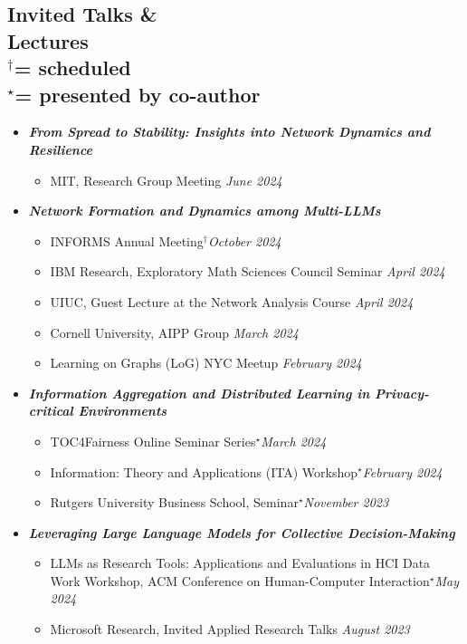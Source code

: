 \documentclass[margin]{res}
\newcommand{\scheduled}[0]{\ensuremath {^\dagger}}
\newcommand{\presentedbycoauthor}[0]{\ensuremath {^{\star}}}
\newcommand{\bemph}[1]{\textbf{\emph{#1}}}
\begin{document}
\begin{resume}
\section{Invited Talks \& \\ Lectures \\
\footnotesize
\scheduled  = \textup{scheduled} \\ \presentedbycoauthor = \textup{presented by co-author}
}

\begin{itemize}[nosep]
	\item \bemph{From Spread to Stability: Insights into Network Dynamics and Resilience}
	\begin{itemize}[nosep]
		\item MIT, Research Group Meeting \hfill \emph{June 2024}
	\end{itemize}

	\item \bemph{Network Formation and Dynamics among Multi-LLMs}
	\begin{itemize}[nosep]
		\item INFORMS Annual Meeting\scheduled \hfill \emph{October 2024}
		\item IBM Research, Exploratory Math Sciences Council Seminar  \hfill \emph{April 2024} 
		\item UIUC, Guest Lecture at the Network Analysis Course \hfill \emph{April 2024}
		\item Cornell University, AIPP Group \hfill \emph{March 2024}
		\item Learning on Graphs (LoG) NYC Meetup \hfill \emph{February 2024}
	\end{itemize}
	
	\item \bemph{Information Aggregation and Distributed Learning in Privacy-critical Environments}
	\begin{itemize}[nosep]
	\item  TOC4Fairness Online Seminar Series\presentedbycoauthor \hfill \emph{March 2024}
	\item Information: Theory and Applications (ITA) Workshop\presentedbycoauthor \hfill \emph{February 2024}
	\item Rutgers University Business School, Seminar\presentedbycoauthor \hfill \emph{November 2023}	
	\end{itemize}

	\item \bemph{Leveraging Large Language Models for Collective Decision-Making}
	\begin{itemize}[nosep]
		\item LLMs as Research Tools: Applications and Evaluations in HCI Data Work Workshop, ACM Conference on Human-Computer Interaction\presentedbycoauthor \hfill \emph{May 2024}
		\item Microsoft Research, Invited Applied Research Talks \hfill \emph{August 2023}
	\end{itemize}


\end{itemize}
\end{resume}
\end{document}
